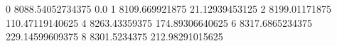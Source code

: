 0 8088.54052734375 0.0
1 8109.669921875 21.12939453125
2 8199.01171875 110.47119140625
4 8263.43359375 174.89306640625
6 8317.6865234375 229.14599609375
8 8301.5234375 212.98291015625
